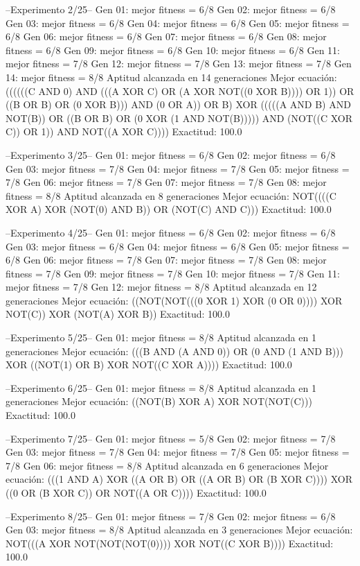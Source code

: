 --Experimento 
 2/25--
Gen 01: mejor fitness = 6/8
Gen 02: mejor fitness = 6/8
Gen 03: mejor fitness = 6/8
Gen 04: mejor fitness = 6/8
Gen 05: mejor fitness = 6/8
Gen 06: mejor fitness = 6/8
Gen 07: mejor fitness = 6/8
Gen 08: mejor fitness = 6/8
Gen 09: mejor fitness = 6/8
Gen 10: mejor fitness = 6/8
Gen 11: mejor fitness = 7/8
Gen 12: mejor fitness = 7/8
Gen 13: mejor fitness = 7/8
Gen 14: mejor fitness = 8/8
Aptitud alcanzada en 14 generaciones
Mejor ecuación: ((((((C AND 0) AND (((A XOR C) OR (A XOR NOT((0 XOR B)))) OR 1)) OR ((B OR B) OR (0 XOR B))) AND (0 OR A)) OR B) XOR (((((A AND B) AND NOT(B)) OR ((B OR B) OR (0 XOR (1 AND NOT(B))))) AND (NOT((C XOR C)) OR 1)) AND NOT((A XOR C))))
 Exactitud: 100.0%

--Experimento 
 3/25--
Gen 01: mejor fitness = 6/8
Gen 02: mejor fitness = 6/8
Gen 03: mejor fitness = 7/8
Gen 04: mejor fitness = 7/8
Gen 05: mejor fitness = 7/8
Gen 06: mejor fitness = 7/8
Gen 07: mejor fitness = 7/8
Gen 08: mejor fitness = 8/8
Aptitud alcanzada en 8 generaciones
Mejor ecuación: NOT((((C XOR A) XOR (NOT(0) AND B)) OR (NOT(C) AND C)))
 Exactitud: 100.0%

--Experimento 
 4/25--
Gen 01: mejor fitness = 6/8
Gen 02: mejor fitness = 6/8
Gen 03: mejor fitness = 6/8
Gen 04: mejor fitness = 6/8
Gen 05: mejor fitness = 6/8
Gen 06: mejor fitness = 7/8
Gen 07: mejor fitness = 7/8
Gen 08: mejor fitness = 7/8
Gen 09: mejor fitness = 7/8
Gen 10: mejor fitness = 7/8
Gen 11: mejor fitness = 7/8
Gen 12: mejor fitness = 8/8
Aptitud alcanzada en 12 generaciones
Mejor ecuación: ((NOT(NOT(((0 XOR 1) XOR (0 OR 0)))) XOR NOT(C)) XOR (NOT(A) XOR B))
 Exactitud: 100.0%

--Experimento 
 5/25--
Gen 01: mejor fitness = 8/8
Aptitud alcanzada en 1 generaciones
Mejor ecuación: (((B AND (A AND 0)) OR (0 AND (1 AND B))) XOR ((NOT(1) OR B) XOR NOT((C XOR A))))
 Exactitud: 100.0%

--Experimento 
 6/25--
Gen 01: mejor fitness = 8/8
Aptitud alcanzada en 1 generaciones
Mejor ecuación: ((NOT(B) XOR A) XOR NOT(NOT(C)))
 Exactitud: 100.0%

--Experimento 
 7/25--
Gen 01: mejor fitness = 5/8
Gen 02: mejor fitness = 7/8
Gen 03: mejor fitness = 7/8
Gen 04: mejor fitness = 7/8
Gen 05: mejor fitness = 7/8
Gen 06: mejor fitness = 8/8
Aptitud alcanzada en 6 generaciones
Mejor ecuación: (((1 AND A) XOR ((A OR B) OR ((A OR B) OR (B XOR C)))) XOR ((0 OR (B XOR C)) OR NOT((A OR C))))
 Exactitud: 100.0%

--Experimento 
 8/25--
Gen 01: mejor fitness = 7/8
Gen 02: mejor fitness = 6/8
Gen 03: mejor fitness = 8/8
Aptitud alcanzada en 3 generaciones
Mejor ecuación: NOT(((A XOR NOT(NOT(NOT(0)))) XOR NOT((C XOR B))))
 Exactitud: 100.0%

